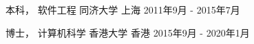 

\begin{cventries}


\cventry
{本科， 软件工程} %
{同济大学} %
{上海} %
{2011年9月 - 2015年7月} %
{ %
}


\cventry
{博士， 计算机科学} %
{香港大学} %
{香港} %
{2015年9月 - 2020年1月} %
{ %
}
\end{cventries}